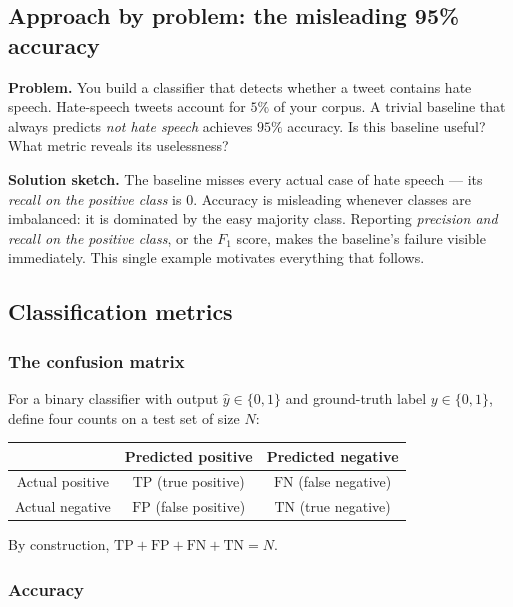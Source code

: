 \subsection{Approach by problem: the misleading 95\% accuracy}
\textbf{Problem.} You build a classifier that detects whether a tweet contains hate speech. Hate-speech tweets account for $5\%$ of your corpus. A trivial baseline that always predicts \emph{not hate speech} achieves $95\%$ accuracy. Is this baseline useful? What metric reveals its uselessness?

\textbf{Solution sketch.} The baseline misses every actual case of hate speech --- its \emph{recall on the positive class} is $0$. Accuracy is misleading whenever classes are imbalanced: it is dominated by the easy majority class. Reporting \emph{precision and recall on the positive class}, or the $F_1$ score, makes the baseline's failure visible immediately. This single example motivates everything that follows.

\subsection{Classification metrics}
\label{sec:eval-classification}

\subsubsection*{The confusion matrix}

\begin{definition}
For a binary classifier with output $\hat{y} \in \{0, 1\}$ and ground-truth label $y \in \{0, 1\}$, define four counts on a test set of size $N$:
\begin{center}
\begin{tabular}{|c|cc|}
\hline
& Predicted positive & Predicted negative \\
\hline
Actual positive & $\mathrm{TP}$ (true positive) & $\mathrm{FN}$ (false negative) \\
Actual negative & $\mathrm{FP}$ (false positive) & $\mathrm{TN}$ (true negative) \\
\hline
\end{tabular}
\end{center}
By construction, $\mathrm{TP} + \mathrm{FP} + \mathrm{FN} + \mathrm{TN} = N$.
\end{definition}

\subsubsection*{Accuracy}

